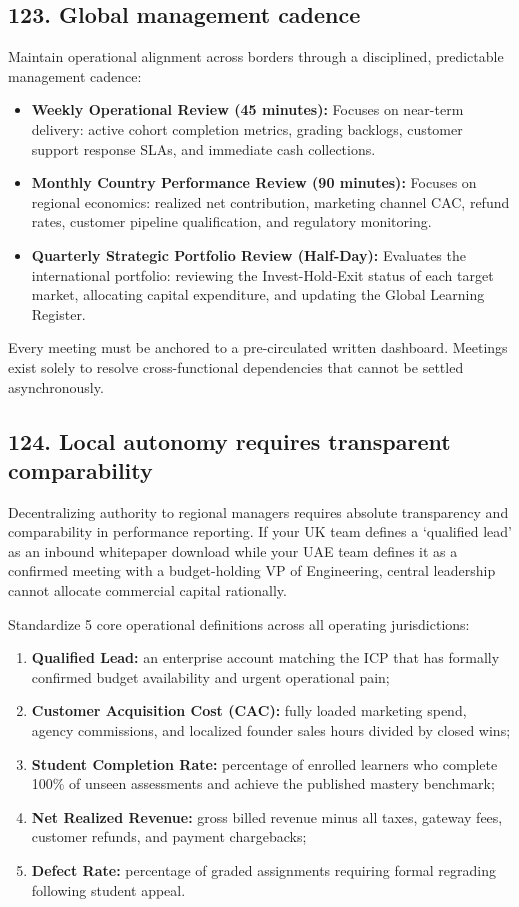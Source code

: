 \subsection{123. Global management cadence}

Maintain operational alignment across borders through a disciplined, predictable management cadence:
\begin{itemize}
    \item \textbf{Weekly Operational Review (45 minutes):} Focuses on near-term delivery: active cohort completion metrics, grading backlogs, customer support response SLAs, and immediate cash collections.
    \item \textbf{Monthly Country Performance Review (90 minutes):} Focuses on regional economics: realized net contribution, marketing channel CAC, refund rates, customer pipeline qualification, and regulatory monitoring.
    \item \textbf{Quarterly Strategic Portfolio Review (Half-Day):} Evaluates the international portfolio: reviewing the Invest-Hold-Exit status of each target market, allocating capital expenditure, and updating the Global Learning Register.
\end{itemize}
Every meeting must be anchored to a pre-circulated written dashboard. Meetings exist solely to resolve cross-functional dependencies that cannot be settled asynchronously.

\subsection{124. Local autonomy requires transparent comparability}

Decentralizing authority to regional managers requires absolute transparency and comparability in performance reporting. If your UK team defines a `qualified lead' as an inbound whitepaper download while your UAE team defines it as a confirmed meeting with a budget-holding VP of Engineering, central leadership cannot allocate commercial capital rationally.

Standardize 5 core operational definitions across all operating jurisdictions:
\begin{enumerate}
    \item \textbf{Qualified Lead:} an enterprise account matching the ICP that has formally confirmed budget availability and urgent operational pain;
    \item \textbf{Customer Acquisition Cost (CAC):} fully loaded marketing spend, agency commissions, and localized founder sales hours divided by closed wins;
    \item \textbf{Student Completion Rate:} percentage of enrolled learners who complete 100\% of unseen assessments and achieve the published mastery benchmark;
    \item \textbf{Net Realized Revenue:} gross billed revenue minus all taxes, gateway fees, customer refunds, and payment chargebacks;
    \item \textbf{Defect Rate:} percentage of graded assignments requiring formal regrading following student appeal.
\end{enumerate}

